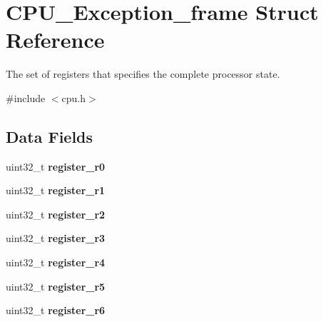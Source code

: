 \hypertarget{structCPU__Exception__frame}{}\section{C\+P\+U\+\_\+\+Exception\+\_\+frame Struct Reference}
\label{structCPU__Exception__frame}


The set of registers that specifies the complete processor state.  




{\ttfamily \#include $<$cpu.\+h$>$}

\subsection*{Data Fields}
\begin{DoxyCompactItemize}
\item 
\mbox{\label{structCPU__Exception__frame_adc8661f30a0d3c865c521c6a375fa67b}} 
uint32\+\_\+t {\bfseries register\+\_\+r0}
\item 
\mbox{\label{structCPU__Exception__frame_ae3f576ecdaf8f5bc1fae46c9eeb0ee1d}} 
uint32\+\_\+t {\bfseries register\+\_\+r1}
\item 
\mbox{\label{structCPU__Exception__frame_a57819b92c8410a547bc9f31b39e81ac6}} 
uint32\+\_\+t {\bfseries register\+\_\+r2}
\item 
\mbox{\label{structCPU__Exception__frame_ac2e4173744cffc50e517ce935de2e849}} 
uint32\+\_\+t {\bfseries register\+\_\+r3}
\item 
\mbox{\label{structCPU__Exception__frame_a7700243e4ebdff1a59b2d06441870f1f}} 
uint32\+\_\+t {\bfseries register\+\_\+r4}
\item 
\mbox{\label{structCPU__Exception__frame_aaf87f303282c3fd53d5578d4a3d2f14f}} 
uint32\+\_\+t {\bfseries register\+\_\+r5}
\item 
\mbox{\label{structCPU__Exception__frame_a2376ccc25a30db84b161e91ac3f38973}} 
uint32\+\_\+t {\bfseries register\+\_\+r6}
\item 

\end{DoxyCompactItemize}
